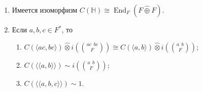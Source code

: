 \documentclass[a4paper,oneside,12pt]{article}
\theoremstyle{plain} { \swapnumbers
\newtheorem{theorem}{Теорема}[subsection]
\newtheorem{corollary}[theorem]{Следствие}
\newtheorem{lemma}[theorem]{Лемма}
\newtheorem{proposition}[theorem]{Утверждение}
\newtheorem{claim}[theorem]{Факт}
}
\theoremstyle{definition} { \swapnumbers
\newtheorem{definition}[theorem]{Определение}
\newtheorem{notation}[theorem]{Обозначение}
\newtheorem{remark}[theorem]{Замечание}
\newtheorem{remarks}[theorem]{Замечания}
\newtheorem{example}[theorem]{Пример}
\newtheorem{examples}[theorem]{Примеры}
\newtheorem{sssection}[theorem]{}
}
\def\End{\operatorname{End}}
\def\la{\langle}
\def\ra{\rangle}
\def\lla{\la\!\la}
\def\rra{\ra\!\ra}
\def\quaternion#1#2#3{\binom{{#1}\:\:{#2}}{#3}}
\begin{document}
\begin{proposition}\label{prop:clifford_superalgebra_of_hyperbolic_plane}
\begin{enumerate}
\item Имеется изоморфизм $C(\mathbb H)\cong\End_F(F\hat\oplus F)$.
\item Если $a,b,c\in F^*$, то
\begin{enumerate}
\item $C(\la ac,bc\ra)\hat\otimes i\left(\quaternion{ac}{bc}{F}\right)\cong C(\la a,b\ra)\hat\otimes i\left(\quaternion{a}{b}{F}\right)$;
\item $C(\lla a,b\rra)\sim i\left(\quaternion{a}{b}{F}\right)$;
\item $C(\lla a,b,c\rra)\sim 1$.
\end{enumerate}
\end{enumerate}
\end{proposition}
\end{document}
